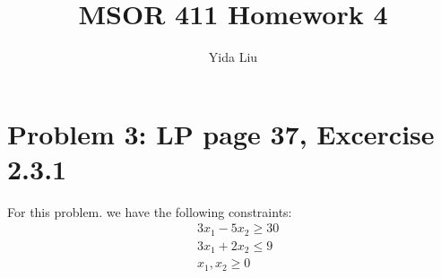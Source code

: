\documentclass[11pt]{article}
\begin{document}
\author{Yida Liu}
\title{MSOR 411 Homework 4}
\maketitle

\section{Problem 3: LP page 37, Excercise 2.3.1}

For this problem. we have the following constraints:
\begin{align}
    & 3x_1 - 5x_2 \geq 30 \\
    & 3x_1 + 2x_2 \leq 9 \\
    & x_1, x_2 \geq 0
\end{align}
\end{document}
